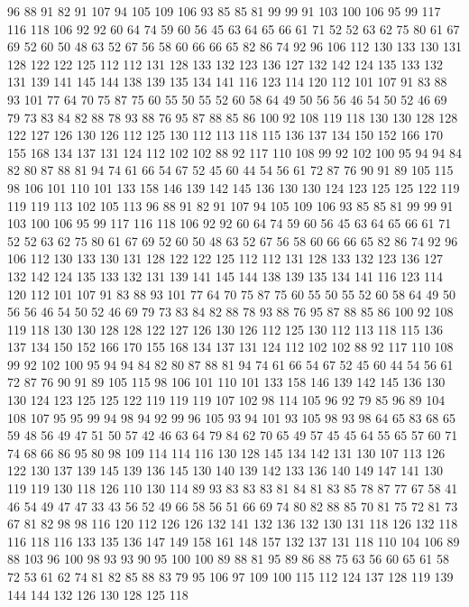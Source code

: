 96 88 91 82 91 107 94 105 109 106 93 85 85 81 99 99 91 103 100 106
95 99 117 116 118 106 92 92 60 64 74 59 60 56 45 63 64 65 66 61
71 52 52 63 62 75 80 61 67 69 52 60 50 48 63 52 67 56 58 60
66 66 65 82 86 74 92 96 106 112 130 133 130 131 128 122 122 125 112 112
131 128 133 132 123 136 127 132 142 124 135 133 132 131 139 141 145 144 138 139
135 134 141 116 123 114 120 112 101 107 91 83 88 93 101 77 64 70 75 87
75 60 55 50 55 52 60 58 64 49 50 56 56 46 54 50 52 46 69 79
73 83 84 82 88 78 93 88 76 95 87 88 85 86 100 92 108 119 118 130
130 128 128 122 127 126 130 126 112 125 130 112 113 118 115 136 137 134 150 152
166 170 155 168 134 137 131 124 112 102 102 88 92 117 110 108 99 92 102 100
95 94 94 84 82 80 87 88 81 94 74 61 66 54 67 52 45 60 44 54
56 61 72 87 76 90 91 89 105 115 98 106 101 110 101 133 158 146 139 142
145 136 130 130 124 123 125 125 122 119 119 119 113 102 105 113 96 88 91 82
91 107 94 105 109 106 93 85 85 81 99 99 91 103 100 106 95 99 117 116
118 106 92 92 60 64 74 59 60 56 45 63 64 65 66 61 71 52 52 63
62 75 80 61 67 69 52 60 50 48 63 52 67 56 58 60 66 66 65 82
86 74 92 96 106 112 130 133 130 131 128 122 122 125 112 112 131 128 133 132
123 136 127 132 142 124 135 133 132 131 139 141 145 144 138 139 135 134 141 116
123 114 120 112 101 107 91 83 88 93 101 77 64 70 75 87 75 60 55 50
55 52 60 58 64 49 50 56 56 46 54 50 52 46 69 79 73 83 84 82
88 78 93 88 76 95 87 88 85 86 100 92 108 119 118 130 130 128 128 122
127 126 130 126 112 125 130 112 113 118 115 136 137 134 150 152 166 170 155 168
134 137 131 124 112 102 102 88 92 117 110 108 99 92 102 100 95 94 94 84
82 80 87 88 81 94 74 61 66 54 67 52 45 60 44 54 56 61 72 87
76 90 91 89 105 115 98 106 101 110 101 133 158 146 139 142 145 136 130 130
124 123 125 125 122 119 119 119 107 102 98 114 105 96 92 79 85 96 89 104
108 107 95 95 99 94 98 94 92 99 96 105 93 94 101 93 105 98 93 98
64 65 83 68 65 59 48 56 49 47 51 50 57 42 46 63 64 79 84 62
70 65 49 57 45 45 64 55 65 57 60 71 74 68 66 86 95 80 98 109
114 114 116 130 128 145 134 142 131 130 107 113 126 122 130 137 139 145 139 136
145 130 140 139 142 133 136 140 149 147 141 130 119 119 130 118 126 110 130 114
89 93 83 83 83 81 84 81 83 85 78 87 77 67 58 41 46 54 49 47
47 33 43 56 52 49 66 58 56 51 66 69 74 80 82 88 85 70 81 75
72 81 73 67 81 82 98 98 116 120 112 126 126 132 141 132 136 132 130 131
118 126 132 118 116 118 116 133 135 136 147 149 158 161 148 157 132 137 131 118
110 104 106 89 88 103 96 100 98 93 93 90 95 100 100 89 88 81 95 89
86 88 75 63 56 60 65 61 58 72 53 61 62 74 81 82 85 88 83 79
95 106 97 109 100 115 112 124 137 128 119 139 144 144 132 126 130 128 125 118
